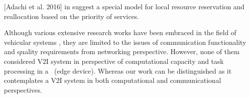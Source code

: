   
[Adachi et al. 2016] in \cite{adachi2016cloud} suggest a special model for local resource reservation and reallocation based on the priority of services.

Although various extensive research works have been embraced in the field of vehicular systems \cite{maeshima2007, korkmaz2006, mak2005}, they are limited to the issues of communication functionality and quality requirements from networking perspective. However, none of them considered V2I system in perspective of computational capacity and task processing in a \bs~(\eg edge device). Whereas our work can be distinguished as it contemplates a V2I system in both computational and communicational perspectives.